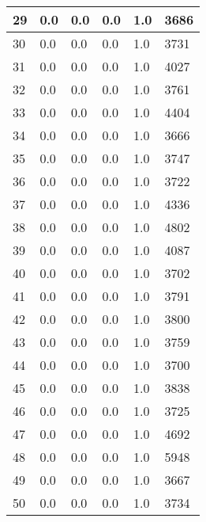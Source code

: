 \begin{longtable}{|l|l|l|l|l|l|}
29 & 0.0 & 0.0 & 0.0 & 1.0 & 3686 \\ \hline 
30 & 0.0 & 0.0 & 0.0 & 1.0 & 3731 \\ \hline 
31 & 0.0 & 0.0 & 0.0 & 1.0 & 4027 \\ \hline 
32 & 0.0 & 0.0 & 0.0 & 1.0 & 3761 \\ \hline 
33 & 0.0 & 0.0 & 0.0 & 1.0 & 4404 \\ \hline 
34 & 0.0 & 0.0 & 0.0 & 1.0 & 3666 \\ \hline 
35 & 0.0 & 0.0 & 0.0 & 1.0 & 3747 \\ \hline 
36 & 0.0 & 0.0 & 0.0 & 1.0 & 3722 \\ \hline 
37 & 0.0 & 0.0 & 0.0 & 1.0 & 4336 \\ \hline 
38 & 0.0 & 0.0 & 0.0 & 1.0 & 4802 \\ \hline 
39 & 0.0 & 0.0 & 0.0 & 1.0 & 4087 \\ \hline 
40 & 0.0 & 0.0 & 0.0 & 1.0 & 3702 \\ \hline 
41 & 0.0 & 0.0 & 0.0 & 1.0 & 3791 \\ \hline 
42 & 0.0 & 0.0 & 0.0 & 1.0 & 3800 \\ \hline 
43 & 0.0 & 0.0 & 0.0 & 1.0 & 3759 \\ \hline 
44 & 0.0 & 0.0 & 0.0 & 1.0 & 3700 \\ \hline 
45 & 0.0 & 0.0 & 0.0 & 1.0 & 3838 \\ \hline 
46 & 0.0 & 0.0 & 0.0 & 1.0 & 3725 \\ \hline 
47 & 0.0 & 0.0 & 0.0 & 1.0 & 4692 \\ \hline 
48 & 0.0 & 0.0 & 0.0 & 1.0 & 5948 \\ \hline 
49 & 0.0 & 0.0 & 0.0 & 1.0 & 3667 \\ \hline 
50 & 0.0 & 0.0 & 0.0 & 1.0 & 3734 \\ \hline 
\end{longtable}